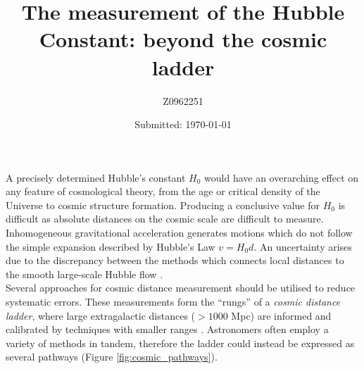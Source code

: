 \documentclass[12pt, onecolumn]{revtex4}    %
\begin{document}
                     


\title{The measurement of the Hubble Constant: beyond the cosmic ladder} 
\date{Submitted: \today{}}
\author{Z0962251}

\maketitle
\thispagestyle{plain} %

A precisely determined Hubble's constant $H_0$ would have an overarching effect on any feature of cosmological theory, from the age or critical density of the Universe to cosmic structure formation. Producing a conclusive value for $H_0$ is difficult as absolute distances on the cosmic scale are difficult to measure. Inhomogeneous gravitational acceleration generates motions which do not follow the simple expansion described by Hubble's Law $v=H_0 d$. An uncertainty arises due to the discrepancy between the methods which connects local distances to the smooth large-scale Hubble flow \citep{fukugita_cosmic}. \\

Several approaches for cosmic distance measurement should be utilised to reduce systematic errors. These measurements form the ``rungs'' of a \textit{cosmic distance ladder}, where large extragalactic distances ($>1000$ Mpc) are informed and calibrated by techniques with smaller ranges \citep{carroll_astro}. Astronomers often employ a variety of methods in tandem, therefore the ladder could instead be expressed as several pathways (Figure \ref{fig:cosmic_pathways}). 

\end{document}
